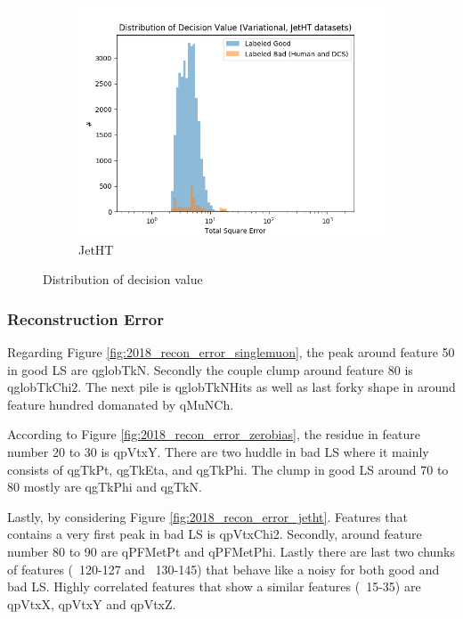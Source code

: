 \begin{figure}[h!]
\begin{subfigure}[b]{0.49\linewidth}
        \includegraphics[width=\linewidth]{images/reco/2018/feature_2/se_dist_Variational1f2_JetHT_unlog.png}
        \caption{JetHT}
    \end{subfigure}
    \caption{Distribution of decision value}
\label{fig:2018_f2_se_dist}
\end{figure}

\subsubsection{Reconstruction Error}
Regarding Figure \ref{fig:2018_recon_error_singlemuon}, the peak around feature 50 in good LS are qglobTkN. Secondly the couple clump around feature 80 is qglobTkChi2. The next pile is qglobTkNHits as well as last forky shape in around feature hundred domanated by qMuNCh. 

According to Figure \ref{fig:2018_recon_error_zerobias}, the residue in feature number 20 to 30 is qpVtxY. There are two huddle in bad LS where it mainly consists of qgTkPt, qgTkEta, and qgTkPhi. The clump in good LS around 70 to 80 mostly are qgTkPhi and qgTkN. 

Lastly, by considering Figure \ref{fig:2018_recon_error_jetht}. Features that contains a very first peak in bad LS is qpVtxChi2. Secondly, around feature number 80 to 90 are qPFMetPt and qPFMetPhi. Lastly there are last two chunks of features (~120-127 and ~130-145) that behave like a noisy for both good and bad LS. Highly correlated features that show a similar features (~15-35) are qpVtxX, qpVtxY and qpVtxZ. 

